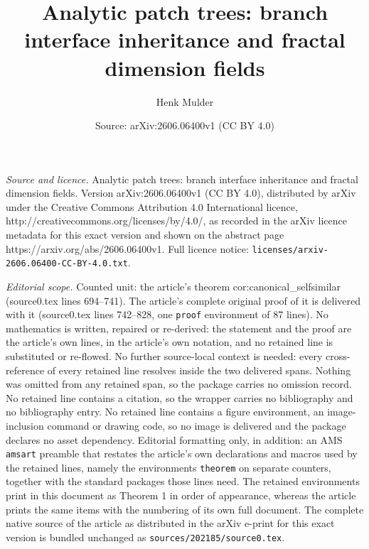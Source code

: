\documentclass[10pt,a4paper]{amsart}
\title{Analytic patch trees: branch interface inheritance and fractal dimension fields}
\author{Henk Mulder}
\date{Source: arXiv:2606.06400v1 (CC BY 4.0)}
\begin{document}
\maketitle

\noindent\emph{Source and licence.} Analytic patch trees: branch interface inheritance and fractal dimension fields. Version arXiv:2606.06400v1 (CC BY 4.0), distributed by arXiv under the Creative Commons Attribution 4.0 International licence, http://creativecommons.org/licenses/by/4.0/, as recorded in the arXiv licence metadata for this exact version and shown on the abstract page https://arxiv.org/abs/2606.06400v1. Full licence notice: \texttt{licenses/arxiv-2606.06400-CC-BY-4.0.txt}.\par\smallskip

\noindent\textit{Editorial scope.} Counted unit: the article's theorem cor:canonical\_selfsimilar (source0.tex lines 694--741). The article's complete original proof of it is delivered with it (source0.tex lines 742--828, one \texttt{proof} environment of 87 lines). No mathematics is written, repaired or re-derived: the statement and the proof are the article's own lines, in the article's own notation, and no retained line is substituted or re-flowed.  No further source-local context is needed: every cross-reference of every retained line resolves inside the two delivered spans.  Nothing was omitted from any retained span, so the package carries no omission record.  No retained line contains a citation, so the wrapper carries no bibliography and no bibliography entry.  No retained line contains a figure environment, an image-inclusion command or drawing code, so no image is delivered and the package declares no asset dependency.  Editorial formatting only, in addition: an AMS \texttt{amsart} preamble that restates the article's own declarations and macros used by the retained lines, namely the environments \texttt{theorem} on separate counters, together with the standard packages those lines need.  The retained environments print in this document as Theorem 1 in order of appearance, whereas the article prints the same items with the numbering of its own full document.  The complete native source of the article as distributed in the arXiv e-print for this exact version is bundled unchanged as \texttt{sources/202185/source0.tex}.
\end{document}
